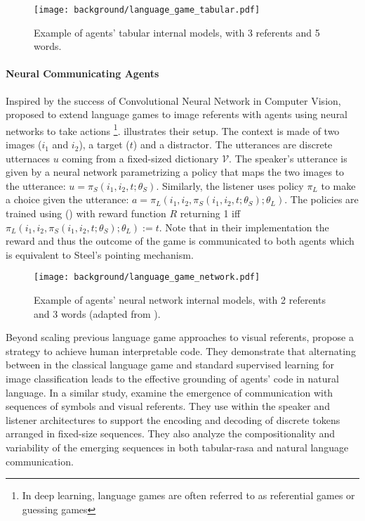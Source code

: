 \begin{figure}[!h]
\centering
\texttt{[image: background/language\_game\_tabular.pdf]}	
\caption{Example of agents' tabular internal models, with 3 referents and 5 words.}
\label{fig:language_game_tabular}
\end{figure}

\paragraph{Neural Communicating Agents}

Inspired by the success of Convolutional Neural Network in Computer Vision, \citet{lazaridou2017multiagent} proposed to extend language games to image referents with agents using neural networks to take actions \footnote{In deep learning, language games are often referred to as referential games or guessing games}.  illustrates their setup. The context is made of two images ($i_1$ and $i_2$), a target ($t$) and a distractor. The utterances are discrete utternaces $u$ coming from a fixed-sized dictionary $\mathcal{V}$.  The speaker's utterance is given by a neural network parametrizing a policy that maps the two images to the utterance: $u=\pi_S(i_1,i_2,t; \theta_S)$. Similarly, the listener uses policy $\pi_L$ to make a choice given the utterance: $a=\pi_L(i_1,i_2,\pi_S(i_1,i_2,t; \theta_S);\theta_L)$. The policies are trained using \rl () with reward function $R$ returning 1 iff $\pi_L(i_1,i_2,\pi_S(i_1,i_2,t; \theta_S);\theta_L) := t$. Note that in their implementation the reward and thus the outcome of the game is communicated to both agents which is equivalent to Steel's pointing mechanism. 

\begin{figure}[!h]
\centering
\texttt{[image: background/language\_game\_network.pdf]}	
\caption{Example of agents' neural network internal models, with 2 referents and 3 words (adapted from \citet{lazaridou2017multiagent}).}
\label{fig:language_game_network}
\end{figure}

Beyond scaling previous language game approaches to visual referents, \citet{lazaridou2017multiagent} propose a strategy to achieve human interpretable code. They demonstrate that alternating between \rl in the classical language game and standard supervised learning for image classification leads to the effective grounding of agents' code in natural language. In a similar study, \citet{havrylov2017emergence} examine the emergence of communication with sequences of symbols and visual referents. They use \lstms within the speaker and listener architectures to support the encoding and decoding of discrete tokens arranged in fixed-size sequences. They also analyze the compositionality and variability of the emerging sequences in both tabular-rasa and natural language communication. 

